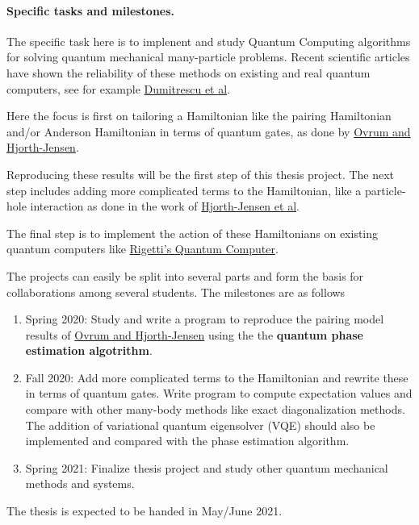 \documentclass[%
oneside,                 %
final,                   %
10pt]{article}
\begin{document}
\paragraph{Specific tasks and milestones.}
The specific task here is to implenent and study Quantum Computing algorithms 
for solving quantum mechanical many-particle
problems. 
Recent scientific articles have shown the reliability of these methods on existing and real quantum computers, see for example 
\href{{https://arxiv.org/abs/1801.03897}}{Dumitrescu et al}.

Here the focus is first on tailoring a Hamiltonian like the pairing Hamiltonian and/or Anderson Hamiltonian in terms of quantum gates, as done by \href{{https://arxiv.org/abs/0705.1928}}{Ovrum and Hjorth-Jensen}.

Reproducing these results will be the first step of this thesis project. The next step includes adding more complicated terms to the Hamiltonian, like a particle-hole interaction as done in the work of \href{{http://iopscience.iop.org/article/10.1088/0954-3899/37/6/064035/meta}}{Hjorth-Jensen et al}.

The final step is to implement the action of these Hamiltonians on existing quantum computers like \href{{https://www.rigetti.com/}}{Rigetti's Quantum Computer}. 

The projects can easily be split into several parts and form the basis for collaborations among several students. The milestones are as follows
\begin{enumerate}
\item Spring 2020: Study and write a program to reproduce the pairing model results of \href{{https://arxiv.org/abs/0705.1928}}{Ovrum and Hjorth-Jensen} using the the \textbf{quantum phase estimation algotrithm}.

\item Fall 2020: Add more complicated terms to the Hamiltonian and rewrite these in terms of quantum gates. Write program to compute expectation values and compare with other many-body methods like exact diagonalization methods. The addition of variational quantum eigensolver (VQE) should also be implemented and compared with the phase estimation algorithm.

\item Spring 2021: Finalize thesis project and study other quantum mechanical methods and systems. 
\end{enumerate}

\noindent
The thesis is expected to be handed in May/June 2021.
\end{document}
